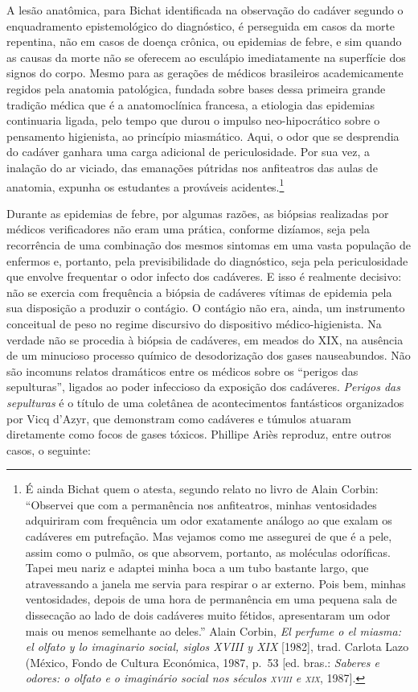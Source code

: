 A lesão anatômica, para Bichat identificada na observação do cadáver
segundo o enquadramento epistemológico do diagnóstico, é perseguida em
casos da morte repentina, não em casos de doença crônica, ou epidemias
de febre, e sim quando as causas da morte não se oferecem ao esculápio
imediatamente na superfície dos signos do corpo. Mesmo para as gerações
de médicos brasileiros academicamente regidos pela anatomia patológica,
fundada sobre bases dessa primeira grande tradição médica que é a
anatomoclínica francesa, a etiologia das epidemias continuaria ligada,
pelo tempo que durou o impulso neo-hipocrático sobre o pensamento
higienista, ao princípio miasmático. Aqui, o odor que se desprendia do
cadáver ganhara uma carga adicional de periculosidade. Por sua vez, a
inalação do ar viciado, das emanações pútridas nos anfiteatros das aulas
de anatomia, expunha os estudantes a prováveis acidentes.\footnote{É
  ainda Bichat quem o atesta, segundo relato no livro de Alain Corbin:
  ``Observei que com a permanência nos anfiteatros, minhas ventosidades
  adquiriram com frequência um odor exatamente análogo ao que exalam os
  cadáveres em putrefação. Mas vejamos como me assegurei de que é a
  pele, assim como o pulmão, os que absorvem, portanto, as moléculas
  odoríficas. Tapei meu nariz e adaptei minha boca a um tubo bastante
  largo, que atravessando a janela me servia para respirar o ar externo.
  Pois bem, minhas ventosidades, depois de uma hora de permanência em
  uma pequena sala de dissecação ao lado de dois cadáveres muito
  fétidos, apresentaram um odor mais ou menos semelhante ao deles.''
  Alain Corbin, \textit{El perfume o el miasma: el olfato y lo imaginario
  social, siglos XVIII y XIX} {[}1982{]}, trad. Carlota Lazo (México,
  Fondo de Cultura Económica, 1987, p.~53 {[}ed. bras.: \textit{Saberes e
  odores: o olfato e o imaginário social nos séculos \textsc{xviii} e \textsc{xix}},
  1987{]}.}

Durante as epidemias de febre, por algumas razões, as biópsias
realizadas por médicos verificadores não eram uma prática, conforme
dizíamos, seja pela recorrência de uma combinação dos mesmos sintomas em
uma vasta população de enfermos e, portanto, pela previsibilidade do
diagnóstico, seja pela periculosidade que envolve frequentar o odor
infecto dos cadáveres. E isso é realmente decisivo: não se exercia com
frequência a biópsia de cadáveres vítimas de epidemia pela sua
disposição a produzir o contágio. O contágio não era, ainda, um
instrumento conceitual de peso no regime discursivo do dispositivo
médico-higienista. Na verdade não se procedia à biópsia de cadáveres, em
meados do XIX, na ausência de um minucioso processo químico de
desodorização dos gases nauseabundos. Não são incomuns relatos
dramáticos entre os médicos sobre os ``perigos das sepulturas'', ligados
ao poder infeccioso da exposição dos cadáveres. \textit{Perigos das
sepulturas} é o título de uma coletânea de acontecimentos fantásticos
organizados por Vicq d'Azyr, que demonstram como cadáveres e túmulos
atuaram diretamente como focos de gases tóxicos. Phillipe Ariès
reproduz, entre outros casos, o seguinte:

